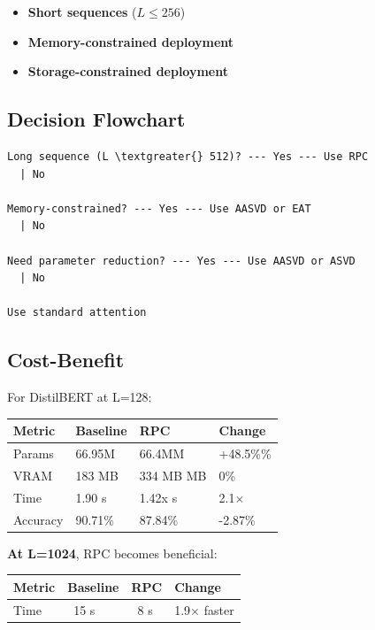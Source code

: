 \begin{itemize}
\item \textbf{Short sequences} ($L \leq 256$)
\item \textbf{Memory-constrained deployment}
\item \textbf{Storage-constrained deployment}

\end{itemize}
\subsection{Decision Flowchart}

\begin{lstlisting}
Long sequence (L \textgreater{} 512)? --- Yes --- Use RPC
  | No
   
Memory-constrained? --- Yes --- Use AASVD or EAT
  | No
   
Need parameter reduction? --- Yes --- Use AASVD or ASVD
  | No
   
Use standard attention
\end{lstlisting}

\subsection{Cost-Benefit}

For DistilBERT at L=128:

\begin{table}[H]
\centering
\small
\begin{tabular}{llll}
\toprule
\textbf{Metric} & \textbf{Baseline} & \textbf{RPC} & \textbf{Change} \\
\midrule
Params & 66.95M & 66.4MM & +48.5\%\% \\
VRAM & 183 MB & 334 MB MB & 0\% \\
Time & 1.90 s & 1.42x s & 2.1$\times$ \\
Accuracy & 90.71\% & 87.84\% & -2.87\% \\
\bottomrule
\end{tabular}
\end{table}

\textbf{At L=1024}, RPC becomes beneficial:

\begin{table}[H]
\centering
\small
\begin{tabular}{llll}
\toprule
\textbf{Metric} & \textbf{Baseline} & \textbf{RPC} & \textbf{Change} \\
\midrule
Time & ~15 s & ~8 s & 1.9$\times$ faster \\
\bottomrule
\end{tabular}
\end{table}

